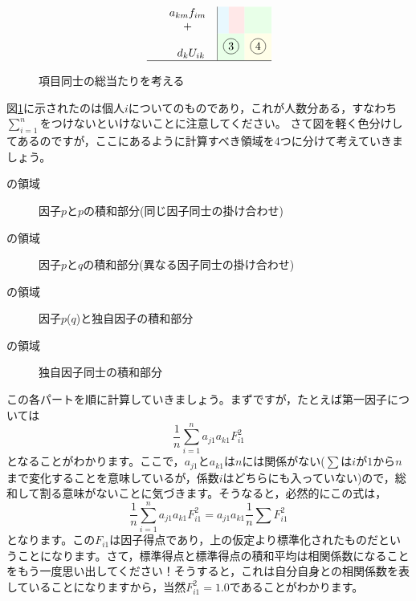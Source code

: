 \documentclass{ltjsbook}
\begin{document}
\begin{figure}[ht]
\[\begin{array}{rl|cccccc|}
			        & \begin{array}{c}a_{km}f_{im}\\+\end{array}              & \multicolumn{4}{>{\columncolor{cyan!9}}c}{}             & \multicolumn{1}{>{\columncolor{red!9}}c}{}               & \multicolumn{1}{>{\columncolor{green!9}}c}{}                                                                                                  \\
			        & \hspace{7pt}\begin{array}{c}\\ d_kU_{ik} \\ \end{array} & \multicolumn{5}{>{\columncolor{green!9}}c}{\circled{3}} & \multicolumn{1}{>{\columncolor{yellow!9}}c}{\circled{4}}                                                                                                                                                 \\\hline
		\end{array}
	\]
	\caption{項目同士の総当たりを考える}
	\label{x03_multiply}
\end{figure}

図\ref{x03_multiply}に示されたのは個人$i$についてのものであり，これが人数分ある，すなわち$\sum_{i=1}^n$をつけないといけないことに注意してください。
さて図を軽く色分けしてあるのですが，ここにあるように計算すべき領域を4つに分けて考えていきましょう。
\begin{description}
	\item[の領域] 因子$p$と$p$の積和部分(同じ因子同士の掛け合わせ)
	\item[の領域] 因子$p$と$q$の積和部分(異なる因子同士の掛け合わせ)
	\item[の領域] 因子$p$($q$)と独自因子の積和部分
	\item[の領域] 独自因子同士の積和部分
\end{description}

この各パートを順に計算していきましょう。まずですが，たとえば第一因子については
\begin{equation}
	\frac{1}{n}\sum_{i=1}^{n}a_{j1}a_{k1}F_{i1}^2
\end{equation}
となることがわかります。ここで，$a_{j1}$と$a_{k1}$は$n$には関係がない($\sum$は$i$が$1$から$n$まで変化することを意味しているが，係数$i$はどちらにも入っていない)ので，総和して割る意味がないことに気づきます。そうなると，必然的にこの式は，
\begin{equation}
	\frac{1}{n}\sum_{i=1}^{n}a_{j1}a_{k1}F_{i1}^2=a_{j1}a_{k1}\frac{1}{n}\sum F_{i1}^2
\end{equation}
となります。この$F_{i1}$は因子得点であり，上の仮定より標準化されたものだということになります。さて，標準得点と標準得点の積和平均は相関係数になることをもう一度思い出してください！そうすると，これは自分自身との相関係数を表していることになりますから，当然$F_{i1}^2=1.0$であることがわかります。
\end{document}
